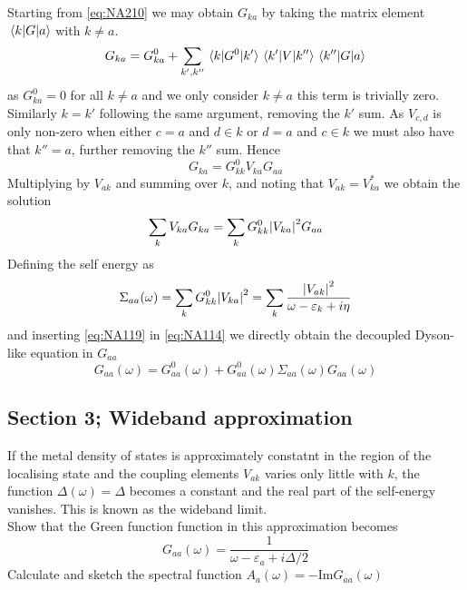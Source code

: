 \begin{solution}
Starting from \eqref{eq:NA210} we may obtain $G_{ka}$ by taking the matrix element $\mel{k}{G}{a}$ with $k\neq a$.
\begin{equation}
    G_{ka} = G_{ka}^{0} + \sum_{k',k''}\mel{k}{G^{0}}{k'}\mel{k'}{V}{k''}\mel{k''}{G}{a}
\end{equation}
as $G^{0}_{ka} = 0$ for all $k\neq a$ and we only consider $k\neq a$ this term is trivially zero. Similarly $k=k'$ following the same argument, removing the $k'$ sum. As $V_{c,d}$ is only non-zero when either $c=a$ and $d\in k$ or $d=a$ and $c\in k$ we must also have that $k''=a$, further removing the $k''$ sum. Hence
\begin{equation}
    G_{ka} = G_{kk}^{0}V_{ka}G_{aa}
\end{equation}
Multiplying by $V_{ak}$ and summing over $k$, and noting that $V_{ak} = V_{ka}^{*}$ we obtain the solution
\begin{equation}\label{eq:NA119}
    \sum_{k}V_{ka}G_{ka} = \sum_{k}G_{kk}^{0}\abs{V_{ka}}^2G_{aa}
\end{equation}
Defining the self energy as
\begin{equation}\label{eq:NA220}
    \Sigma_{aa}(\omega)=\sum_{k}G^{0}_{kk}\abs{V_{ka}}^2=\sum_{k}\dfrac{\abs{V_{ak}}^2}{\omega-\varepsilon_k+i\eta}
\end{equation}
and inserting \eqref{eq:NA119} in \eqref{eq:NA114} we directly obtain the decoupled Dyson-like equation in $G_{aa}$
\begin{equation}
    G_{aa}(\omega) = G_{aa}^{0}(\omega) + G_{aa}^{0}(\omega)\Sigma_{aa}(\omega)G_{aa}(\omega)
\end{equation}
\end{solution}

\subsection{Section 3; Wideband approximation}

\begin{exercise}
If the metal density of states is approximately constatnt in the region of the localising state and the coupling elements $V_{ak}$ varies only little with $k$, the function $\Delta(\omega) =\Delta$ becomes a constant and the real part of the self-energy vanishes. This is known as the wideband limit. \\
Show that the Green function function in this approximation becomes
\begin{equation}
    G_{aa}(\omega) = \frac{1}{\omega - \varepsilon_a+i \Delta/2}
\end{equation}
Calculate and sketch the spectral function $A_a(\omega) = - \mathrm{Im}G_{aa}(\omega)$
\end{exercise}

